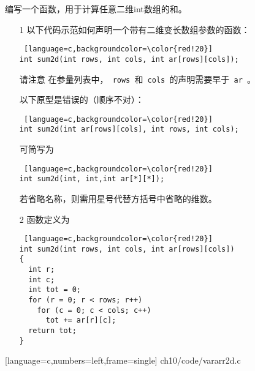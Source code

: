 \begin{frame}[fragile]\ft{\secname}
编写一个函数，用于计算任意二维int数组的和。
\end{frame}

\begin{frame}[fragile]\ft{\secname}
\begin{enumerate}
\item[1] 以下代码示范如何声明一个带有二维变长数组参数的函数：
\begin{lstlisting} [language=c,backgroundcolor=\color{red!20}]
int sum2d(int rows, int cols, int ar[rows][cols]);
\end{lstlisting}
请注意
在参量列表中，\lstinline| rows |和\lstinline| cols |的声明需要早于\lstinline| ar |。\\[0.1in]

\item[] 以下原型是错误的（顺序不对）：
\begin{lstlisting} [language=c,backgroundcolor=\color{red!20}]
int sum2d(int ar[rows][cols], int rows, int cols);
\end{lstlisting}\vspace{0.05in}

\item[] 可简写为
\begin{lstlisting} [language=c,backgroundcolor=\color{red!20}]
int sum2d(int, int,int ar[*][*]);
\end{lstlisting}
若省略名称，则需用星号代替方括号中省略的维数。
\end{enumerate}
\end{frame}

\begin{frame}[fragile]\ft{\secname}
\begin{enumerate}
\item[2] 函数定义为
\begin{lstlisting} [language=c,backgroundcolor=\color{red!20}]
int sum2d(int rows, int cols, int ar[rows][cols])
{
  int r;
  int c;
  int tot = 0;
  for (r = 0; r < rows; r++)
    for (c = 0; c < cols; c++)
      tot += ar[r][c];
  return tot;
}
\end{lstlisting}
\end{enumerate}
\end{frame}

\begin{frame}\ft{\secname}

[language=c,numbers=left,frame=single]
{ch10/code/vararr2d.c}
\end{frame}


